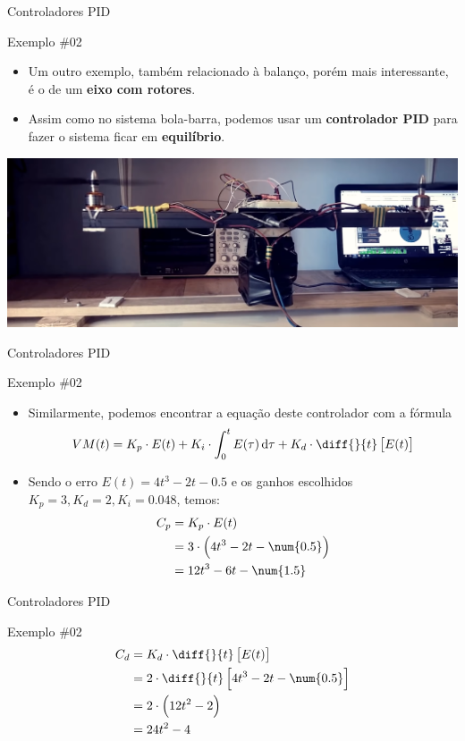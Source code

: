 \begin{frame}{Controladores PID}
	\begin{block}{Exemplo \#02}
		\begin{itemize}
			\item Um outro exemplo, também relacionado à balanço, porém mais interessante, é o de um \textbf{eixo com rotores}.
			\item Assim como no sistema bola-barra, podemos usar um \textbf{controlador PID} para fazer o sistema ficar em \textbf{equilíbrio}.
		\end{itemize}
	\end{block}

	\medskip

	\centering
	
	\includegraphics[width=0.9\linewidth]{Figuras/Ch13/fig4}
\end{frame}


\begin{frame}{Controladores PID}
	\begin{block}{Exemplo \#02}
		\begin{itemize}
			\item Similarmente, podemos encontrar a equação deste controlador com a fórmula
			\[ VM(t)=K_p\cdot E(t)+K_i\cdot \int_{0}^{t}E(\tau)\dif \tau +K_d\cdot\diff{}{t}\sbr{E(t)} \]
			\item Sendo o erro $ E(t)=4t^{3}-2t-\num{0.5} $ e os ganhos escolhidos $ K_p=3, K_d=2, K_i=\num{0.048} $, temos:
			\begin{align*}
			C_p	&=K_p\cdot E(t)\\
			&=3\cdot\del{4t^{3}-2t-\num{0.5}}\\
			&=12t^{3}-6t-\num{1.5}
			\end{align*}
		\end{itemize}
	\end{block}
\end{frame}


\begin{frame}{Controladores PID}
	\begin{block}{Exemplo \#02}
		\begin{align*}
		C_d	&=K_d\cdot\diff{}{t}\sbr{E(t)}\\
		&=2\cdot\diff{}{t}\sbr{4t^{3}-2t-\num{0.5}}\\
		&=2\cdot\del{12t^{2}-2}\\
		&=24t^{2}-4
		\end{align*}
	\end{block}
\end{frame}


